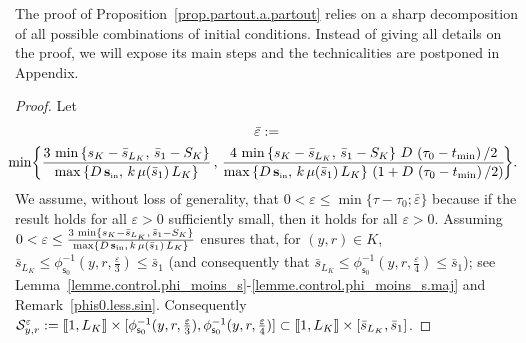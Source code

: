 \documentclass[AHL,Unicode,longabstracts,published]{cedram}
\newcommand{\llbracket}{\mathopen{[\mkern -2.7mu[}}
\newcommand{\rrbracket}{\mathclose{]\mkern -2.7mu]}}
\newcommand{\clS}{\mathcal{S}}
\newcommand{\Sin}{{\mathbf s}_{\textrm{\tiny\rm in}}}
\newcommand{\SminK}{s_K}
\newcommand{\SmaxK}{S_K}
\newcommand{\barmu}{\mu(\bar s_1)}
\newcommand{\phis}{\phi_{\textsf{s}_0}^{-1}}
\newcommand{\lmax}{{L_K}}
\newcommand{\setunlmax}{\llbracket 1, \lmax\rrbracket}
\newcommand{\1}{\mathbf{1}}
\begin{document}
The proof of Proposition~\ref{prop.partout.a.partout} relies on a sharp decomposition of all possible combinations of initial conditions. Instead of giving all details on the proof, we will expose its main steps and the technicalities are postponed in Appendix.
\begin{proof}
Let
\begin{multline*}
\bar \varepsilon:=\\
\mkern-10mu\min\!\left\{
\frac{3\,\min\left\{\SminK-\bar s_{\lmax},\, \bar s_1-\SmaxK\right\}} {\max\left\{D\,\Sin,\, k\,\barmu\,\lmax\right\}} \,, \,
\frac{4\,\min\left\{\SminK-\bar s_{\lmax},\,\bar s_1-\SmaxK\right\}\,D\,\left(\tau_0-t_{\min}\right)/2} {\max\left\{D\,\Sin,\, k\,\barmu\,\lmax\right\}\,\left(1+D\,\left(\tau_0-t_{\min}\right)/2\right)}\!\right\}\!.
\end{multline*}
We assume, without loss of generality, that $0<\varepsilon\leq \min\{\tau-\tau_0; \bar \varepsilon\}$ because if the result holds for all $\varepsilon>0$ sufficiently small, then it holds for all $\varepsilon>0$. Assuming $0<\varepsilon\leq \frac{3\,\min\{\SminK-\bar s_{\lmax},\, \bar s_1-\SmaxK\}}{\max\{D\,\Sin,\, k\,\barmu\,\lmax\}}$ ensures that, for $(y,r)\in K$, $\bar s_{\lmax}\leq \phis(y,r,\frac{\varepsilon}{3})\leq\bar s_1$ (and consequently that $\bar s_{\lmax}\leq \phis(y,r,\frac{\varepsilon}{4})\leq\bar s_1$); see Lemma~\ref{lemme.control.phi_moins_s}-\ref{lemme.control.phi_moins_s.maj} and Remark~\ref{phis0.less.sin}. Consequently $\clS_{y,r}^\varepsilon:=\setunlmax \times [\phis(y,r,\frac{\varepsilon}{3}), \phis(y,r,\frac{\varepsilon}{4})] \subset \setunlmax \times [\bar s_{\lmax}, \bar s_1]$.




\end{proof}
\end{document}
